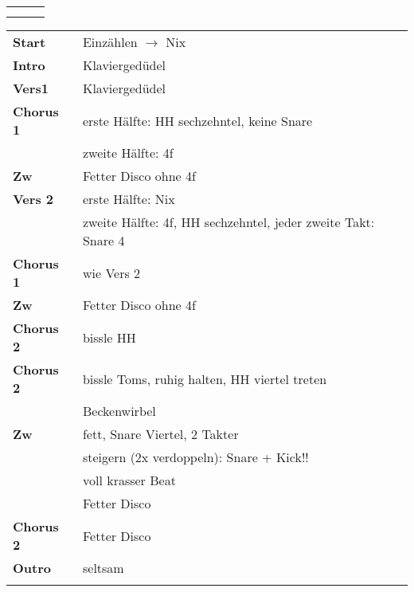 

\begin{tabular}{p{0.6cm}p{12cm}p{1.4cm}}
	\rowcolor{cyan} \myRow{\thesongnumber} & \myRow{Der Weg} & \myRow{126} \\
	                                       &                 &             \\
\end{tabular}

\begin{tabular}{p{1.8cm}l}
	\textbf{Start}    & Einzählen $\rightarrow$ Nix                                   \\
	\textbf{Intro}    & Klaviergedüdel                                                \\
	\textbf{Vers1}    & Klaviergedüdel                                                \\
	\textbf{Chorus 1} & erste Hälfte: HH sechzehntel, keine Snare                     \\
	                  & zweite Hälfte: 4f                                             \\
	\textbf{Zw}       & Fetter Disco ohne 4f                                          \\
	\textbf{Vers 2}   & erste Hälfte: Nix                                             \\
	                  & zweite Hälfte: 4f, HH sechzehntel, jeder zweite Takt: Snare 4 \\
	\textbf{Chorus 1} & wie Vers 2                                                    \\
	\textbf{Zw}       & Fetter Disco ohne 4f                                          \\
	\textbf{Chorus 2} & bissle HH                                                     \\
	\textbf{Chorus 2} & bissle Toms, ruhig halten, HH viertel treten                  \\
	                  & Beckenwirbel                                                  \\
	\textbf{Zw}       & fett, Snare Viertel, 2 Takter                                 \\
	                  & steigern (2x verdoppeln): Snare + Kick!!                      \\
	                  & voll krasser Beat                                             \\
	                  & Fetter Disco                                                  \\
	\textbf{Chorus 2} & Fetter Disco                                                  \\
	\textbf{Outro}    & seltsam                                                       \\
	                  &                                                               \\
\end{tabular}